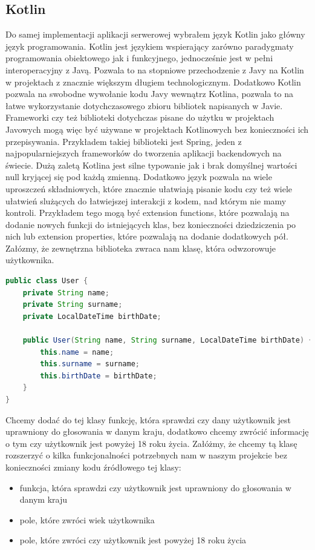 \subsection{Kotlin}\label{subsec:uzyte-technologie-kotlin}
Do samej implementacji aplikacji serwerowej wybrałem język Kotlin jako główny język programowania.
Kotlin jest językiem wspierający zarówno paradygmaty programowania obiektowego jak i funkcyjnego, jednocześnie jest w pełni interoperacyjny z Javą.
Pozwala to na stopniowe przechodzenie z Javy na Kotlin w projektach z znacznie większym długiem technologicznym.
Dodatkowo Kotlin pozwala na swobodne wywołanie kodu Javy wewnątrz Kotlina, pozwala to na łatwe wykorzystanie dotychczasowego zbioru bibliotek napisanych w Javie.
Frameworki czy też biblioteki dotychczas pisane do użytku w projektach Javowych mogą więc być używane w projektach Kotlinowych bez konieczności ich przepisywania.
Przykładem takiej biblioteki jest Spring, jeden z najpopularniejszych frameworków do tworzenia aplikacji backendowych na świecie.
Dużą zaletą Kotlina jest silne typowanie jak i brak domyślnej wartości null kryjącej się pod każdą zmienną.
Dodatkowo język pozwala na wiele uproszczeń składniowych, które znacznie ułatwiają pisanie kodu czy też wiele ułatwień slużących do łatwiejszej interakcji z kodem, nad którym nie mamy kontroli.
Przykładem tego mogą być extension functions, które pozwalają na dodanie nowych funkcji do istniejących klas, bez konieczności dziedziczenia po nich lub extension properties, które pozwalają na dodanie dodatkowych pół.
Załózmy, że zewnętrzna biblioteka zwraca nam klasę, która odwzorowuje użytkownika.
\begin{lstlisting}[caption=Przykład klasy User w Javie, language=java]
public class User {
    private String name;
    private String surname;
    private LocalDateTime birthDate;

    public User(String name, String surname, LocalDateTime birthDate) {
        this.name = name;
        this.surname = surname;
        this.birthDate = birthDate;
    }
}
\end{lstlisting}
Chcemy dodać do tej klasy funkcję, która sprawdzi czy dany użytkownik jest uprawniony do głosowania w danym kraju, dodatkowo chcemy zwrócić informację o tym czy użytkownik jest powyżej 18 roku życia.
Załóżmy, że chcemy tą klasę rozszerzyć o kilka funkcjonalności potrzebnych nam w naszym projekcie bez konieczności zmiany kodu źródłowego tej klasy:
\begin{itemize}
    \item funkcja, która sprawdzi czy użytkownik jest uprawniony do głosowania w danym kraju
    \item pole, które zwróci wiek użytkownika
    \item pole, które zwróci czy użytkownik jest powyżej 18 roku życia
\end{itemize}


